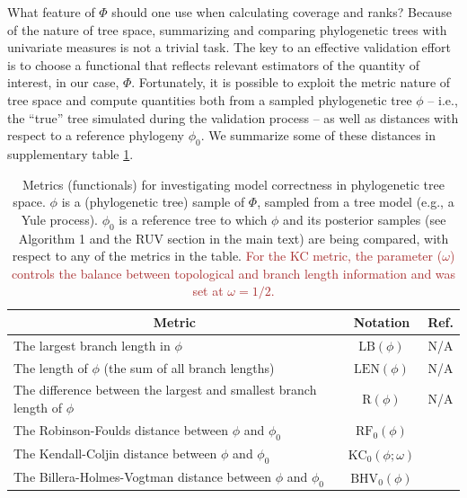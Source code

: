 \documentclass[oneside]{article}
\begin{document}
What feature of $\Phi$ should one use when calculating coverage and ranks?
Because of the nature of tree space, summarizing and comparing phylogenetic trees with univariate measures is not a trivial task.
The key to an effective validation effort is to choose a functional that reflects relevant estimators of the quantity of interest, in our case, $\Phi$.
Fortunately, it is possible to exploit the metric nature of tree space and compute quantities both from a sampled phylogenetic tree $\phi$ -- i.e., the ``true'' tree simulated during the validation process -- as well as distances with respect to a reference phylogeny $\phi_0$.
We summarize some of these distances in supplementary table \ref{suptab:dists}.

\begin{table}[h]
  \caption{Metrics (functionals) for investigating model correctness in phylogenetic tree space. $\phi$ is a (phylogenetic tree) sample of $\Phi$, sampled from a tree model (e.g., a Yule process).
  $\phi_0$ is a reference tree to which $\phi$ and its posterior samples (see Algorithm 1 and the RUV section in the main text) are being compared, with respect to any of the metrics in the table.
  \textcolor{brown}{For the KC metric, the parameter ($\omega$) controls the balance between topological and branch length information and was set at $\omega = 1/2$.} }
  \label{suptab:dists}
  \centering
  \begin{tabular}{ l|c|c }
    \hline
    \multicolumn{1}{c|}{Metric} & Notation & Ref. \\
    \hline  
    \rowcolor{gray!10}The largest branch length in $\phi$ & $\text{LB}(\phi)$ & N/A\\
    The length of $\phi$ (the sum of all branch lengths) & $\text{LEN}(\phi)$ & N/A\\
    \rowcolor{gray!10}The difference between the largest and smallest branch length of $\phi$ & $\text{R}(\phi)$ & N/A\\
    The Robinson-Foulds distance between $\phi$ and $\phi_0$ & $\text{RF}_0(\phi)$ & \citep{rf81}\\
    \rowcolor{gray!10}The Kendall-Coljin distance between $\phi$ and $\phi_0$ & $\text{KC}_0(\phi;\omega)$ & \citep{Kendall2016}\\
    The Billera-Holmes-Vogtman distance between $\phi$ and $\phi_0$ & $\text{BHV}_0(\phi)$ & \citep{Billera2001}\\
    \hline
  \end{tabular}
\end{table}
\end{document}
